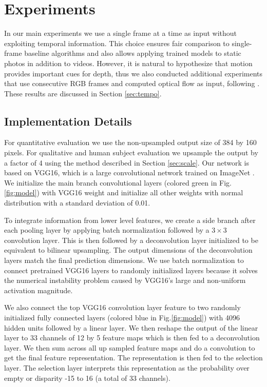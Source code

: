\documentclass[runningheads]{llncs}
\begin{document}
\section{Experiments}
In our main experiments we use a single frame at a time as input without exploiting temporal information.
This choice ensures fair comparison to single-frame baseline algorithms and also allows applying trained models to static photos in addition to videos.
However, it is natural to hypothesize that motion provides important cues for depth, thus we also conducted additional experiments that use consecutive RGB frames and computed optical flow as input, following \cite{wang2015towards}.
These results are discussed in Section \ref{sec:tempo}.

\subsection{Implementation Details}
For quantitative evaluation we use the non-upsampled output size of 384 by 160 pixels.
For qualitative and human subject evaluation we upsample the output by a factor of 4 using the method described in Section \ref{sec:scale}.
Our network is based on VGG16, which is a large convolutional network trained on ImageNet \cite{simonyan2014very}.
We initialize the main branch convolutional layers (colored green in Fig.\ref{fig:model}) with VGG16 weight and initialize all other weights with normal distribution with a standard deviation of 0.01.

To integrate information from lower level features, we create a side branch after each pooling layer by applying batch normalization \cite{ioffe2015batch} followed by a $3 \times 3$ convolution layer. This is then followed by a deconvolution layer initialized to be equivalent to bilinear upsampling.
The output dimensions of the deconvolution layers match the final prediction dimensions.
We use batch normalization to connect pretrained VGG16 layers to randomly initialized layers because it solves the numerical instability problem caused by VGG16's large and non-uniform activation magnitude.

We also connect the top VGG16 convolution layer feature to two randomly initialized fully connected layers (colored blue in Fig.\ref{fig:model}) with 4096 hidden units followed by a linear layer.
We then reshape the output of the linear layer to 33 channels of 12 by 5 feature maps which is then fed to a deconvolution layer.
We then sum across all up sampled feature maps and do a convolution to get the final feature representation.
The representation is then fed to the selection layer.
The selection layer interprets this representation as the probability over empty or disparity -15 to 16 (a total of 33 channels).
\end{document}

